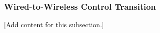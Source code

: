 
\subsubsection{Wired-to-Wireless Control Transition}
\label{subsubsec:design_12_2_wired_wireless_transition}

[Add content for this subsection.]
